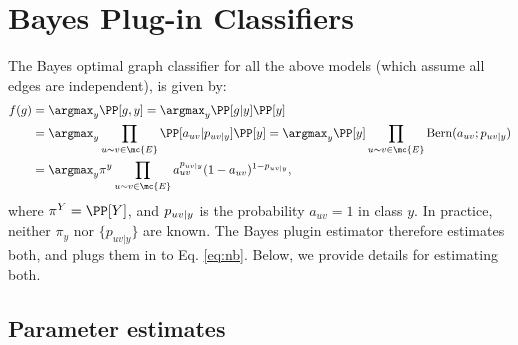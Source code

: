  

\section{Bayes Plug-in Classifiers}

The Bayes optimal graph classifier for all the above models  (which assume all edges are independent), is given by:
\begin{align} \label{eq:nb}
	f(g) &= \argmax_y \PP[g,y] = \argmax_y \PP[g|y] \PP[y] 
	\nonumber \\&= \argmax_y \prod_{u\sim v\in\mc{E}} \PP[a_{uv} | \pp_{uv|y}] \PP[y]
	= \argmax_y \PP[y] \prod_{u\sim v\in\mc{E}} \text{Bern}(a_{uv}; \pp_{uv|y}) 
	\nonumber \\&= \argmax_y \pi^y \prod_{u\sim v\in\mc{E}} a_{uv}^{\pp_{uv|y}} (1-a_{uv})^{1-\pp_{uv|y}}, 
\end{align}
where $\pi^Y=\PP[Y]$, and  $p_{uv|y}$ is the probability $a_{uv}=1$ in class $y$.  In practice, neither $\pi_y$ nor $\{p_{uv|y}\}$ are known.  The Bayes plugin estimator therefore estimates both, and plugs them in to Eq. \eqref{eq:nb}.  Below, we provide details for estimating both. 


\subsection{Parameter estimates}


